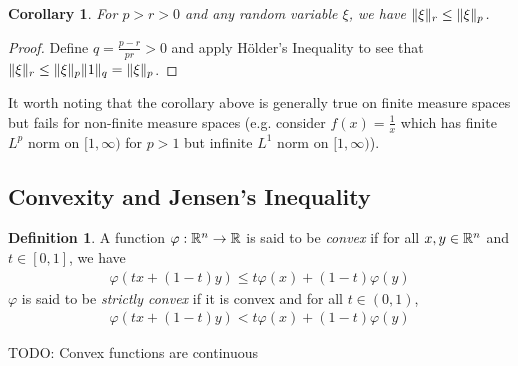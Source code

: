 \documentclass{amsart}
\newtheorem{cor}[thm]{Corollary}
\theoremstyle{remark}
\theoremstyle{definition}
\newtheorem{defn}[thm]{Definition}
\begin{document}
\begin{cor}\label{IncreasingMoments}For $p > r > 0$ and any random variable $\xi$, we
  have $\lVert \xi \rVert_r \leq \lVert \xi \rVert_p$.
\end{cor}
\begin{proof}Define $q = \frac{p -r}{pr} > 0$ and apply H\"older's
  Inequality to see that $\lVert \xi \rVert_r \leq \lVert \xi \rVert_p \lVert 1 \rVert_q = \lVert \xi \rVert_p $.
\end{proof}
It worth noting that the corollary above is generally true on finite
measure spaces but fails for non-finite measure spaces (e.g. consider
$f(x) = \frac{1}{x}$ which has finite $L^p$ norm on $[1,\infty)$ for
$p > 1$ but infinite $L^1$ norm on $[1,\infty)$).

\subsection{Convexity and Jensen's Inequality}
\begin{defn}A function $\varphi : \mathbb{R}^n \to \mathbb{R}$ is said to be
  \emph{convex} if for all $x, y \in \mathbb{R}^n$ and $t \in [0,1]$, we
  have
\begin{align*}
\varphi( tx + (1-t)y) \leq t\varphi(x) + (1-t)\varphi(y)
\end{align*}
$\varphi$ is said to be \emph{strictly convex} if it is convex and for
all $t \in (0,1)$, 
\begin{align*}
\varphi( tx + (1-t)y) < t\varphi(x) + (1-t)\varphi(y)
\end{align*}
\end{defn}

TODO: Convex functions are continuous
\end{document}
